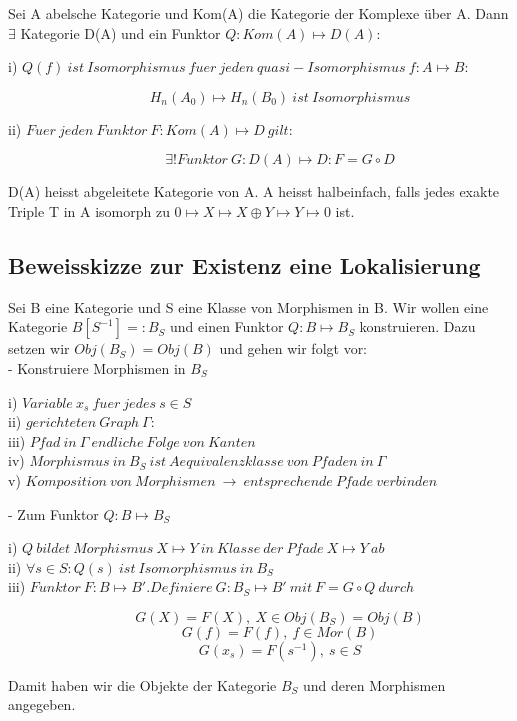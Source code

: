 \documentclass[12pt]{article}
\begin{document}
Sei A abelsche Kategorie und Kom(A) die Kategorie der Komplexe über A.
Dann $\exists$ Kategorie D(A) und ein Funktor $Q: Kom(A) \mapsto D(A):$
\begin{description}
    \item[i) $Q(f) \: ist \: Isomorphismus \: fuer \: jeden \: quasi-Isomorphismus \: f: A \mapsto B$:]
        \[H_n(A_0) \mapsto H_n(B_0) \: ist \: Isomorphismus\]
    \item[ii) $Fuer \: jeden \: Funktor \: F : Kom(A) \mapsto D \: gilt$:]
        \[\exists! Funktor \: G : D(A) \mapsto D: F = G \circ D\]
\end{description}
D(A) heisst abgeleitete Kategorie von A. A heisst halbeinfach, falls jedes exakte Triple
T in A isomorph zu $0 \mapsto X \mapsto X \oplus Y \mapsto Y \mapsto 0$ ist. 

\subsection{Beweisskizze zur Existenz eine Lokalisierung}

Sei B eine Kategorie und S eine Klasse von Morphismen in B. Wir wollen eine Kategorie $B[S^{-1}] =: B_S$ und einen 
Funktor $Q : B \mapsto B_S$ konstruieren. Dazu setzen wir $Obj(B_S) = Obj(B)$ und gehen wir folgt vor:\\
- Konstruiere Morphismen in $B_S$
\begin{description}
    \item[i) $Variable \: x_s \: fuer \: jedes \: s \in S$]
    \item[ii) $gerichteten \: Graph \: \Gamma$:]
    \item[iii) $Pfad \: in \: \Gamma \: endliche \: Folge \: von \: Kanten$]
    \item[iv) $Morphismus \: in \: B_S \: ist \: Aequivalenzklasse \: von \: Pfaden \: in \: \Gamma$]
    \item[v) $Komposition \: von \: Morphismen \: \rightarrow \: entsprechende \: Pfade \: verbinden $]
\end{description}
- Zum Funktor $Q : B \mapsto B_S$
\begin{description}
    \item[i) $Q \: bildet \: Morphismus \: X \mapsto Y \: in \: Klasse \: der \: Pfade \: X \mapsto Y \: ab$]
    \item[ii) $\forall s \in S : Q(s) \: ist \: Isomorphismus \: in \: B_S$]
    \item[iii) $Funktor \: F : B \mapsto B'. Definiere \: G : B_S \mapsto B' \: mit \: F = G \circ Q \: durch$]
        \[G(X) = F(X), \: X \in Obj(B_S) = Obj(B)\]
        \[G(f) = F(f), \: f \in Mor(B)\]
        \[G(x_s) = F(s^{-1}), \: s \in S\]
\end{description}
Damit haben wir die Objekte der Kategorie $B_S$ und deren Morphismen angegeben.
\end{document}
